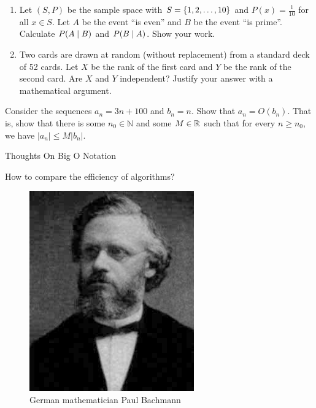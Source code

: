 \documentclass[10pt]{beamer}
\begin{document}
\begin{frame}

\begin{mygreenbox}[title=\text{Problems Quiz (Conditional Prob, Random Variables, Expectation)}]
\begin{enumerate}
	\item Let $(S,P)$ be the sample space with $S=\{ {1,2,\hdots, 10} \}$ and $P(x) =\frac{1}{10}$ for all $x \in S$.  Let $A$ be the event \enquote{is even} and $B$ be the event \enquote{is prime}. Calculate $P(A \; | \; B)$ and $P(B \; | \; A)$. Show your work.
	\item Two cards are drawn at random (without replacement) from a standard deck of 52 cards. Let $X$ be the rank of the first card and $Y$ be the rank of the second card. Are $X$ and $Y$ independent? Justify your answer with a mathematical argument.
\end{enumerate}
\end{mygreenbox}
\vfill 
\begin{myredbox}[title=Reading Quiz (Big O notation)]
Consider the sequences $a_n = 3n + 100$ and $b_n=n$.  Show  that $a_n = O(b_n)$.  That is, show that there is some $n_0 \in \mathbb{N}$ and some $M \in \mathbb{R}$ such that for every $n \geq n_0$, we have $|a_n| \leq M|b_n|$.
\end{myredbox}
\end{frame}




\begin{frame}[standout]
Thoughts On Big O Notation
\end{frame}

\begin{frame}{How to compare the efficiency of algorithms?}
\begin{figure}
\includegraphics[width=.5\textwidth]{images/paul_bachmann}
\caption{German mathematician Paul Bachmann}

\pause 
    
\end{figure}
\end{frame}
\end{document}

